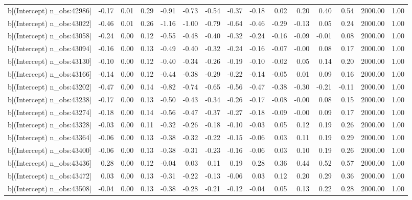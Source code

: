 \begin{table}[ht]
\begin{tabular}{rrrrrrrrrrrrrrr}
  b[(Intercept) n\_obs:42986] & -0.17 & 0.01 & 0.29 & -0.91 & -0.73 & -0.54 & -0.37 & -0.18 & 0.02 & 0.20 & 0.40 & 0.54 & 2000.00 & 1.00 \\ 
  b[(Intercept) n\_obs:43022] & -0.46 & 0.01 & 0.26 & -1.16 & -1.00 & -0.79 & -0.64 & -0.46 & -0.29 & -0.13 & 0.05 & 0.24 & 2000.00 & 1.00 \\ 
  b[(Intercept) n\_obs:43058] & -0.24 & 0.00 & 0.12 & -0.55 & -0.48 & -0.40 & -0.32 & -0.24 & -0.16 & -0.09 & -0.01 & 0.08 & 2000.00 & 1.00 \\ 
  b[(Intercept) n\_obs:43094] & -0.16 & 0.00 & 0.13 & -0.49 & -0.40 & -0.32 & -0.24 & -0.16 & -0.07 & -0.00 & 0.08 & 0.17 & 2000.00 & 1.00 \\ 
  b[(Intercept) n\_obs:43130] & -0.10 & 0.00 & 0.12 & -0.40 & -0.34 & -0.26 & -0.19 & -0.10 & -0.02 & 0.05 & 0.14 & 0.20 & 2000.00 & 1.00 \\ 
  b[(Intercept) n\_obs:43166] & -0.14 & 0.00 & 0.12 & -0.44 & -0.38 & -0.29 & -0.22 & -0.14 & -0.05 & 0.01 & 0.09 & 0.16 & 2000.00 & 1.00 \\ 
  b[(Intercept) n\_obs:43202] & -0.47 & 0.00 & 0.14 & -0.82 & -0.74 & -0.65 & -0.56 & -0.47 & -0.38 & -0.30 & -0.21 & -0.11 & 2000.00 & 1.00 \\ 
  b[(Intercept) n\_obs:43238] & -0.17 & 0.00 & 0.13 & -0.50 & -0.43 & -0.34 & -0.26 & -0.17 & -0.08 & -0.00 & 0.08 & 0.15 & 2000.00 & 1.00 \\ 
  b[(Intercept) n\_obs:43274] & -0.18 & 0.00 & 0.14 & -0.56 & -0.47 & -0.37 & -0.27 & -0.18 & -0.09 & -0.00 & 0.09 & 0.17 & 2000.00 & 1.00 \\ 
  b[(Intercept) n\_obs:43328] & -0.03 & 0.00 & 0.11 & -0.32 & -0.26 & -0.18 & -0.10 & -0.03 & 0.05 & 0.12 & 0.19 & 0.26 & 2000.00 & 1.00 \\ 
  b[(Intercept) n\_obs:43364] & -0.06 & 0.00 & 0.13 & -0.38 & -0.32 & -0.22 & -0.15 & -0.06 & 0.03 & 0.11 & 0.19 & 0.29 & 2000.00 & 1.00 \\ 
  b[(Intercept) n\_obs:43400] & -0.06 & 0.00 & 0.13 & -0.38 & -0.31 & -0.23 & -0.16 & -0.06 & 0.03 & 0.10 & 0.19 & 0.26 & 2000.00 & 1.00 \\ 
  b[(Intercept) n\_obs:43436] & 0.28 & 0.00 & 0.12 & -0.04 & 0.03 & 0.11 & 0.19 & 0.28 & 0.36 & 0.44 & 0.52 & 0.57 & 2000.00 & 1.00 \\ 
  b[(Intercept) n\_obs:43472] & 0.03 & 0.00 & 0.13 & -0.31 & -0.22 & -0.13 & -0.06 & 0.03 & 0.12 & 0.20 & 0.29 & 0.36 & 2000.00 & 1.00 \\ 
  b[(Intercept) n\_obs:43508] & -0.04 & 0.00 & 0.13 & -0.38 & -0.28 & -0.21 & -0.12 & -0.04 & 0.05 & 0.13 & 0.22 & 0.28 & 2000.00 & 1.00 \\ 

\end{tabular}
\end{table}
